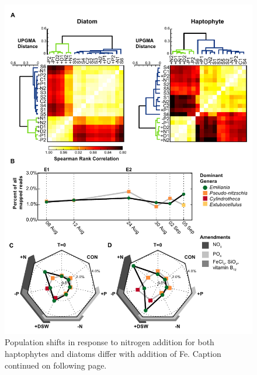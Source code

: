 \begin{figure}[p!]
  \centering
    \includegraphics[width=1\textwidth]{Images/C5_Figure1_v2.pdf}
    \caption[Population shifts in response to nitrogen addition for both haptophytes and diatoms]{Population shifts in response to nitrogen addition for both haptophytes and diatoms differ with addition of Fe. Caption continued on following page.}
  \label{fig:c5f1}
\end{figure}

